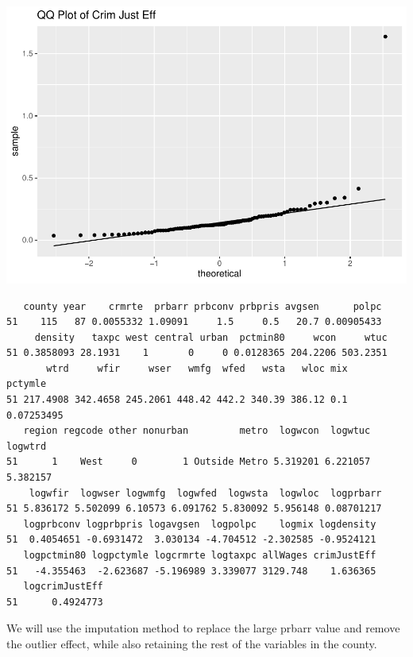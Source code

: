 \documentclass[]{article}
\newenvironment{Shaded}{}{}
\newcommand{\CommentTok}[1]{\textcolor[rgb]{0.00,0.50,0.00}{#1}}
\newcommand{\DecValTok}[1]{#1}
\newcommand{\NormalTok}[1]{#1}
\newcommand{\OperatorTok}[1]{#1}
\newcommand{\StringTok}[1]{\textcolor[rgb]{0.00,0.50,0.50}{#1}}
\begin{document}
\includegraphics{Bagnard_Gaustad_Hartman_Leung_Lab_3_files/figure-latex/unnamed-chunk-61-1.pdf}

\begin{Shaded}
\end{Shaded}

\begin{verbatim}
   county year    crmrte  prbarr prbconv prbpris avgsen      polpc
51    115   87 0.0055332 1.09091     1.5     0.5   20.7 0.00905433
     density   taxpc west central urban  pctmin80     wcon     wtuc
51 0.3858093 28.1931    1       0     0 0.0128365 204.2206 503.2351
       wtrd     wfir     wser   wmfg  wfed   wsta   wloc mix    pctymle
51 217.4908 342.4658 245.2061 448.42 442.2 340.39 386.12 0.1 0.07253495
   region regcode other nonurban         metro  logwcon  logwtuc  logwtrd
51      1    West     0        1 Outside Metro 5.319201 6.221057 5.382157
    logwfir  logwser logwmfg  logwfed  logwsta  logwloc  logprbarr
51 5.836172 5.502099 6.10573 6.091762 5.830092 5.956148 0.08701217
   logprbconv logprbpris logavgsen  logpolpc    logmix logdensity
51  0.4054651 -0.6931472  3.030134 -4.704512 -2.302585 -0.9524121
   logpctmin80 logpctymle logcrmrte logtaxpc allWages crimJustEff
51   -4.355463  -2.623687 -5.196989 3.339077 3129.748    1.636365
   logcrimJustEff
51      0.4924773
\end{verbatim}

We will use the imputation method to replace the large prbarr value and
remove the outlier effect, while also retaining the rest of the
variables in the county.
\end{document}
